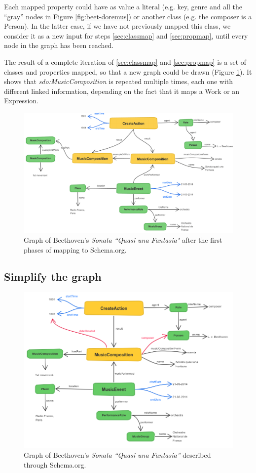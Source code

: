 \documentclass{llncs}
\begin{document}
Each mapped property could have as value a literal (e.g. key, genre and all the ``gray'' nodes in Figure \ref{fig:beet-doremus}) or another class  (e.g. the composer is a Person). In the latter case, if we have not previously mapped this class, we consider it as a new input for steps \ref{sec:classmap} and \ref{sec:propmap}, until every node in the graph has been reached.

The result of a complete iteration of \ref{sec:classmap} and \ref{sec:propmap} is a set of classes and properties mapped, so that a new graph could be drawn (Figure \ref{fig:beet-inter}). It shows that \textit{sdo:MusicComposition} is repeated multiple times, each one with different linked information, depending on the fact that it maps a Work or an Expression.

\begin{figure}
\includegraphics[width=12cm]{img/beethoven-intermediate.png}
\centering
\caption{Graph of Beethoven's \textit{Sonata ``Quasi una Fantasia"} after the first phases of mapping to Schema.org.}
\label{fig:beet-inter}
\end{figure}

\subsection{Simplify the graph}
\begin{figure}
\includegraphics[width=12cm]{img/Beethoven-Schema.png}
\centering
\caption{Graph of Beethoven's \textit{Sonata ``Quasi una Fantasia''} described through Schema.org.}
\label{fig:beet-schema}
\end{figure}
\end{document}
